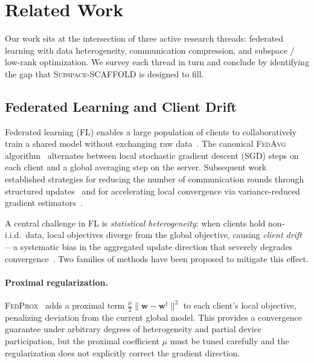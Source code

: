 
\section{Related Work}
\label{sec:related_work}

Our work sits at the intersection of three active research threads:
federated learning with data heterogeneity, communication compression,
and subspace / low-rank optimization.
We survey each thread in turn and conclude by identifying the gap that
\textsc{Subspace-SCAFFOLD} is designed to fill.

\subsection{Federated Learning and Client Drift}
\label{subsec:fl}

Federated learning (FL) enables a large population of clients to
collaboratively train a shared model without exchanging raw
data~\citep{mcmahan2017communication}.
The canonical \textsc{FedAvg} algorithm~\citep{mcmahan2017communication}
alternates between local stochastic gradient descent (SGD) steps on
each client and a global averaging step on the server.
Subsequent work established strategies for reducing the number of
communication rounds through structured
updates~\citep{konecny2016federated} and for accelerating local
convergence via variance-reduced gradient
estimators~\citep{zhao2021fedpage}.

A central challenge in FL is \emph{statistical heterogeneity}: when
clients hold non-i.i.d.\ data, local objectives diverge from the
global objective, causing \emph{client drift}—a systematic bias in the
aggregated update direction that severely degrades
convergence~\citep{karimireddy2020scaffold,wang2020tackling}.
Two families of methods have been proposed to mitigate this effect.

\paragraph{Proximal regularization.}
\textsc{FedProx}~\citep{li2020fedprox} adds a proximal term
$\frac{\mu}{2}\|\mathbf{w} - \mathbf{w}^t\|^2$ to each client's local
objective, penalizing deviation from the current global model.
This provides a convergence guarantee under arbitrary degrees of
heterogeneity and partial device participation, but the proximal
coefficient $\mu$ must be tuned carefully and the regularization does
not explicitly correct the gradient direction.

